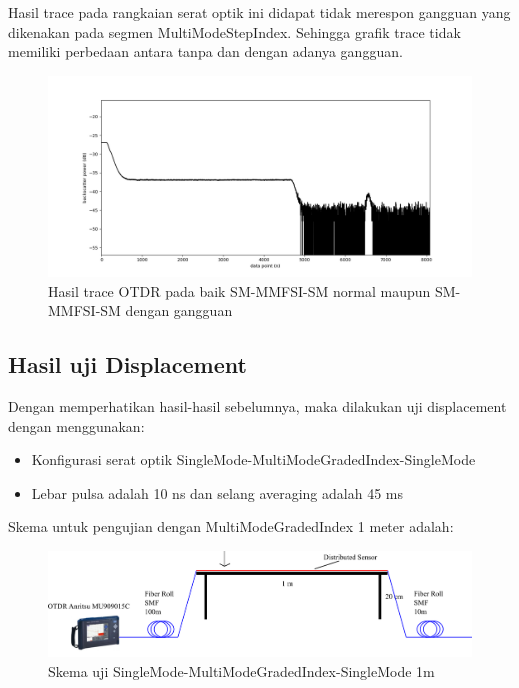 \documentclass[12pt]{article}
\begin{document}
\begin{enumerate}
		Hasil trace pada rangkaian serat optik ini didapat tidak merespon gangguan yang dikenakan pada segmen MultiModeStepIndex.
		Sehingga grafik trace tidak memiliki perbedaan antara tanpa dan dengan adanya gangguan.
		
		\begin{figure}[!ht]
			\centering
			\captionsetup{justification=centering}
			\includegraphics[width=\linewidth]{images/Bab_4/Bab_4_3f1}
			\caption[Trace SM-MMFSI-SM ]{\small{Hasil trace OTDR pada baik SM-MMFSI-SM  normal maupun SM-MMFSI-SM  dengan gangguan}}
		\end{figure}
	
	\end{enumerate}
	
		
	\newpage
	
	\subsection{Hasil uji Displacement}
	Dengan memperhatikan hasil-hasil sebelumnya, maka dilakukan uji displacement dengan menggunakan:
	\begin{itemize}
		\item Konfigurasi serat optik SingleMode-MultiModeGradedIndex-SingleMode
		\item Lebar pulsa adalah 10 ns dan selang averaging adalah 45 ms
	\end{itemize}

	Skema untuk pengujian dengan MultiModeGradedIndex 1 meter adalah:
	
	\begin{figure}[!ht]
		\centering
		\captionsetup{justification=centering}
		\includegraphics[width=0.7\linewidth]{images/Bab_4/uji_1m}
		\caption[Trace SMF-SMF]{\small{Skema uji SingleMode-MultiModeGradedIndex-SingleMode 1m}}
	\end{figure}
	
\end{document}
